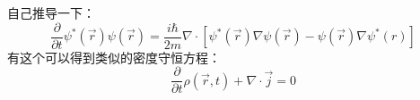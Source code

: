 自己推导一下：$$\frac{\partial}{\partial t}\psi ^*\left( \vec{r} \right) \psi \left( \vec{r} \right) =\frac{i\hbar}{2m}\nabla \cdot \left[ \psi ^*\left( \vec{r} \right) \nabla \psi \left( \vec{r} \right) -\psi \left( \vec{r} \right) \nabla \psi ^*\left( r \right) \right] $$
有这个可以得到类似的密度守恒方程：$$\frac{\partial}{\partial t}\rho \left( \vec{r},t \right) +\nabla \cdot \vec{j}=0$$